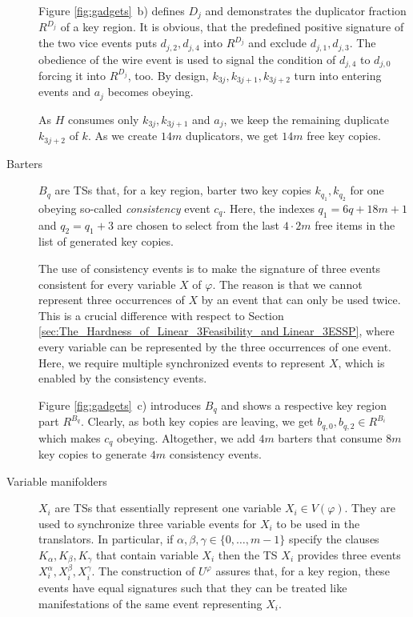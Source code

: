 \documentclass[english]{lipics_hacked}
\begin{document}
\begin{description}
Figure \ref{fig:gadgets}~b) defines $D_j$ and demonstrates the duplicator fraction $R^{D_j}$ of a key region.
It is obvious, that the predefined positive signature of the two vice events puts $d_{j,2}, d_{j,4}$ into $R^{D_j}$ and exclude $d_{j,1}, d_{j,3}$.
The obedience of the wire event is used to signal the condition of $d_{j,4}$ to $d_{j,0}$ forcing it into $R^{D_j}$, too.
By design, $k_{3j}, k_{3j+1}, k_{3j+2}$ turn into entering events and $a_j$ becomes obeying.

As $H$ consumes only $k_{3j}, k_{3j+1}$ and $a_j$, we keep the remaining duplicate $k_{3j+2}$ of $k$.
As we create $14m$ duplicators, we get $14m$ free key copies.
%
\item[Barters]
$B_q$ are TSs that, for a key region, barter two key copies $k_{q_1}, k_{q_2}$ for one obeying so-called \emph{consistency} event $c_q$.
Here, the indexes $q_1 = 6q + 18m + 1$ and $q_2 = q_1 + 3$ are chosen to select from the last $4 \cdot 2m$ free items in the list of generated key copies.

The use of consistency events is to make the signature of three events consistent for every variable $X$ of $\varphi$.
The reason is that we cannot represent three occurrences of $X$ by an event that can only be used twice.
This is a crucial difference with respect to Section \ref{sec:The_Hardness_of_Linear_3Feasibility_and Linear_3ESSP}, where every variable can be represented by the three occurrences of one event.
Here, we require multiple synchronized events to represent $X$, which is enabled by the consistency events.

Figure \ref{fig:gadgets}~c) introduces $B_q$ and shows a respective key region part $R^{B_q}$.
Clearly, as both key copies are leaving, we get $b_{q,0}, b_{q,2} \in R^{B_i}$ which makes $c_q$ obeying.
Altogether, we add $4m$ barters that consume $8m$ key copies to generate $4m$ consistency events. 
%
\item[Variable manifolders]
$X_i$ are TSs that essentially represent one variable $X_i \in V(\varphi)$.
They are used to synchronize three variable events for $X_i$ to be used in the translators.
In particular, if $\alpha, \beta, \gamma \in \{0, \dots, m-1\}$ specify the clauses $K_\alpha, K_\beta, K_\gamma$ that contain variable $X_i$ then the TS $X_i$ provides three events $X_i^\alpha, X_i^\beta, X_i^\gamma$.
The construction of $U^\varphi$ assures that, for a key region, these events have equal signatures such that they can be treated like manifestations of the same event representing $X_i$.


\end{description}
\end{document}
